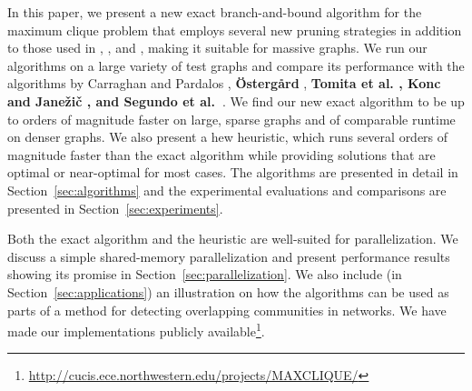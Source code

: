 In this paper, we present a new exact branch-and-bound
algorithm for the maximum clique problem that employs 
several new pruning strategies in addition to those used in \cite{pardalos},
\cite{ostergard}, \cite{citeulike:7905505} and \cite{konc2007improved},
making it suitable for massive graphs.
We run our algorithms on a large variety of test graphs and compare its performance with the
algorithms by Carraghan and Pardalos \cite{pardalos}, {\bf \"{O}sterg{\aa}rd} \cite{ostergard}, {\bf Tomita et al. \cite{citeulike:7905505}\cite{walcom}, Konc and Jane\v{z}i\v{c} \cite{konc2007improved}, and Segundo et al.~\cite{SanSegundo}}. 
We find our new exact algorithm to be up to orders of magnitude faster on large,
sparse graphs and of comparable runtime on denser graphs.
We also present a hew heuristic, which runs several orders of magnitude faster than the exact algorithm while providing solutions that are optimal or near-optimal for most cases. The algorithms are presented in detail in Section~\ref{sec:algorithms} and the experimental evaluations and comparisons are presented in Section~\ref{sec:experiments}. 

Both the exact algorithm and the heuristic are well-suited for parallelization.
We discuss a simple shared-memory parallelization and present performance 
results showing its promise in Section~\ref{sec:parallelization}. 
We also include (in Section~\ref{sec:applications})
an illustration on how the algorithms can be used as parts of a method
for detecting overlapping communities in networks.
We have made our implementations publicly available\footnote{\url{http://cucis.ece.northwestern.edu/projects/MAXCLIQUE/}}.




